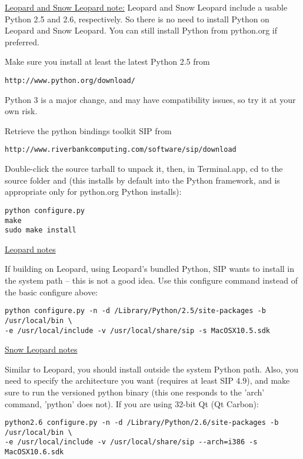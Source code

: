\hypertarget{toc28}{}
\underline{Leopard and Snow Leopard note:} Leopard and Snow Leopard include a usable
Python 2.5 and 2.6, respectively. So there is no need to install Python on
Leopard and Snow Leopard. You can still install Python from python.org if preferred.

Make sure you install at least the latest Python 2.5 from 

\begin{verbatim}
http://www.python.org/download/
\end{verbatim}

Python 3 is a major change, and may have compatibility issues, so try it at your own risk.

\hypertarget{toc29}{}
Retrieve the python bindings toolkit SIP from

\begin{verbatim}
http://www.riverbankcomputing.com/software/sip/download
\end{verbatim}

Double-click the source tarball to unpack it, then, in Terminal.app, cd to the source folder
and (this installs by default into the Python framework, and is appropriate only for python.org Python installs):

\begin{verbatim}
python configure.py 
make 
sudo make install 
\end{verbatim}

\underline{Leopard notes}

If building on Leopard, using Leopard's bundled Python, SIP wants to install in the
system path -- this is not a good idea.  Use this configure command instead of the 
basic configure above:

\begin{verbatim}
python configure.py -n -d /Library/Python/2.5/site-packages -b /usr/local/bin \
-e /usr/local/include -v /usr/local/share/sip -s MacOSX10.5.sdk
\end{verbatim}

\underline{Snow Leopard notes}

Similar to Leopard, you should install outside the system Python path.
Also, you need to specify the architecture you want (requires at least SIP 4.9),
and make sure to run the versioned python binary (this one responds to the
'arch' command, 'python' does not). If you are using 32-bit Qt (Qt Carbon):

\begin{verbatim}
python2.6 configure.py -n -d /Library/Python/2.6/site-packages -b /usr/local/bin \
-e /usr/local/include -v /usr/local/share/sip --arch=i386 -s MacOSX10.6.sdk
\end{verbatim}


